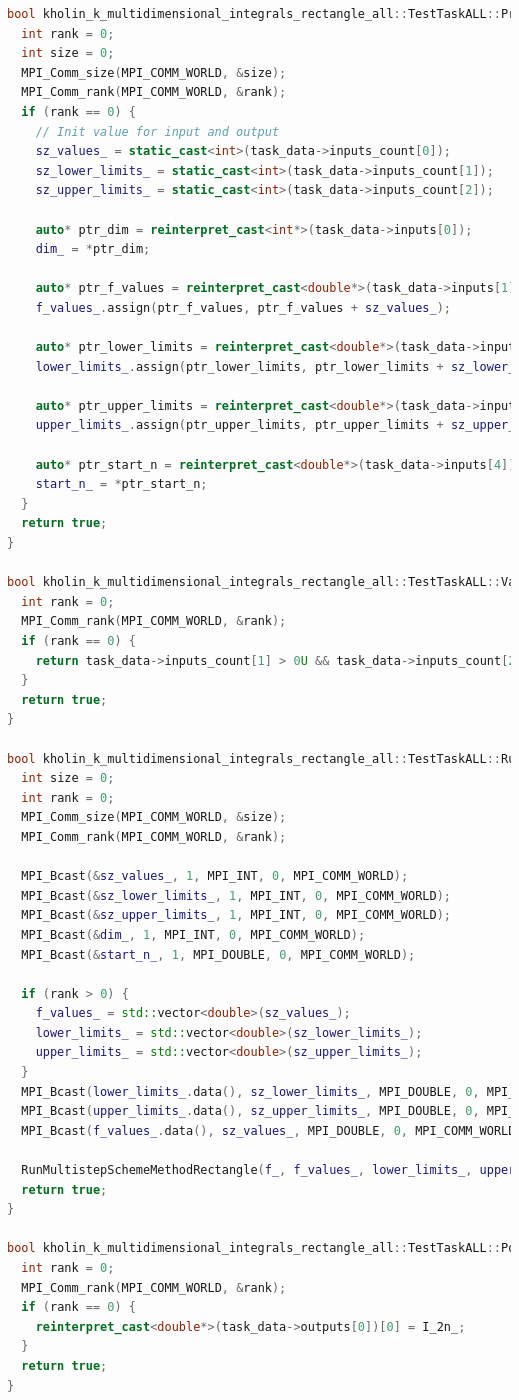 \documentclass[14pt,a4paper]{article}
\begin{document}
\begin{framed}
\begin{lstlisting}[language=C++]
bool kholin_k_multidimensional_integrals_rectangle_all::TestTaskALL::PreProcessingImpl() {
  int rank = 0;
  int size = 0;
  MPI_Comm_size(MPI_COMM_WORLD, &size);
  MPI_Comm_rank(MPI_COMM_WORLD, &rank);
  if (rank == 0) {
    // Init value for input and output
    sz_values_ = static_cast<int>(task_data->inputs_count[0]);
    sz_lower_limits_ = static_cast<int>(task_data->inputs_count[1]);
    sz_upper_limits_ = static_cast<int>(task_data->inputs_count[2]);

    auto* ptr_dim = reinterpret_cast<int*>(task_data->inputs[0]);
    dim_ = *ptr_dim;

    auto* ptr_f_values = reinterpret_cast<double*>(task_data->inputs[1]);
    f_values_.assign(ptr_f_values, ptr_f_values + sz_values_);

    auto* ptr_lower_limits = reinterpret_cast<double*>(task_data->inputs[2]);
    lower_limits_.assign(ptr_lower_limits, ptr_lower_limits + sz_lower_limits_);

    auto* ptr_upper_limits = reinterpret_cast<double*>(task_data->inputs[3]);
    upper_limits_.assign(ptr_upper_limits, ptr_upper_limits + sz_upper_limits_);

    auto* ptr_start_n = reinterpret_cast<double*>(task_data->inputs[4]);
    start_n_ = *ptr_start_n;
  }
  return true;
}

bool kholin_k_multidimensional_integrals_rectangle_all::TestTaskALL::ValidationImpl() {
  int rank = 0;
  MPI_Comm_rank(MPI_COMM_WORLD, &rank);
  if (rank == 0) {
    return task_data->inputs_count[1] > 0U && task_data->inputs_count[2] > 0U;
  }
  return true;
}

bool kholin_k_multidimensional_integrals_rectangle_all::TestTaskALL::RunImpl() {
  int size = 0;
  int rank = 0;
  MPI_Comm_size(MPI_COMM_WORLD, &size);
  MPI_Comm_rank(MPI_COMM_WORLD, &rank);

  MPI_Bcast(&sz_values_, 1, MPI_INT, 0, MPI_COMM_WORLD);
  MPI_Bcast(&sz_lower_limits_, 1, MPI_INT, 0, MPI_COMM_WORLD);
  MPI_Bcast(&sz_upper_limits_, 1, MPI_INT, 0, MPI_COMM_WORLD);
  MPI_Bcast(&dim_, 1, MPI_INT, 0, MPI_COMM_WORLD);
  MPI_Bcast(&start_n_, 1, MPI_DOUBLE, 0, MPI_COMM_WORLD);

  if (rank > 0) {
    f_values_ = std::vector<double>(sz_values_);
    lower_limits_ = std::vector<double>(sz_lower_limits_);
    upper_limits_ = std::vector<double>(sz_upper_limits_);
  }
  MPI_Bcast(lower_limits_.data(), sz_lower_limits_, MPI_DOUBLE, 0, MPI_COMM_WORLD);
  MPI_Bcast(upper_limits_.data(), sz_upper_limits_, MPI_DOUBLE, 0, MPI_COMM_WORLD);
  MPI_Bcast(f_values_.data(), sz_values_, MPI_DOUBLE, 0, MPI_COMM_WORLD);

  RunMultistepSchemeMethodRectangle(f_, f_values_, lower_limits_, upper_limits_, dim_, start_n_);
  return true;
}

bool kholin_k_multidimensional_integrals_rectangle_all::TestTaskALL::PostProcessingImpl() {
  int rank = 0;
  MPI_Comm_rank(MPI_COMM_WORLD, &rank);
  if (rank == 0) {
    reinterpret_cast<double*>(task_data->outputs[0])[0] = I_2n_;
  }
  return true;
}


\end{lstlisting}
\end{framed}
\end{document}
